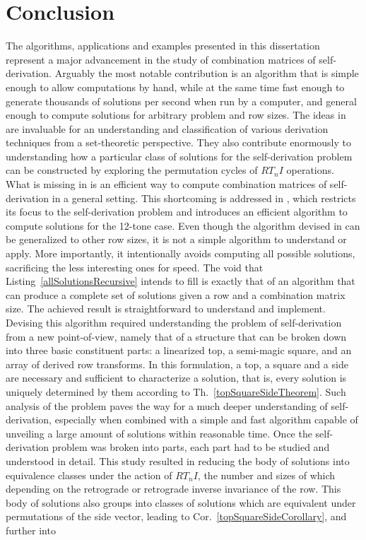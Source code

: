 
\section{Conclusion}

The algorithms, applications and examples presented in this dissertation represent a major advancement in the study of combination matrices of self-derivation. Arguably the most notable contribution is an algorithm that is simple enough to allow computations by hand, while at the same time fast enough to generate thousands of solutions per second when run by a computer, and general enough to compute solutions for arbitrary problem and row sizes. The ideas in \cite{Starr1984} are invaluable for an understanding and classification of various derivation techniques from a set-theoretic perspective. They also contribute enormously to understanding how a particular class of solutions for the self-derivation problem can be constructed by exploring the permutation cycles of $RT_nI$ operations. What is missing in \cite{Starr1984} is an efficient way to compute combination matrices of self-derivation in a general setting. This shortcoming is addressed in \cite{Kowalski1987b}, which restricts its focus to the self-derivation problem and introduces an efficient algorithm to compute solutions for the 12-tone case. Even though the algorithm devised in \cite{Kowalski1987b} can be generalized to other row sizes, it is not a simple algorithm to understand or apply. More importantly, it intentionally avoids computing all possible solutions, sacrificing the less interesting ones for speed. The void that Listing~\ref{allSolutionsRecursive} intends to fill is exactly that of an algorithm that can produce a complete set of solutions given a row and a combination matrix size. The achieved result is straightforward to understand and implement. Devising this algorithm required understanding the problem of self-derivation from a new point-of-view, namely that of a structure that can be broken down into three basic constituent parts: a linearized top, a semi-magic square, and an array of derived row transforms. In this formulation, a top, a square and a side are necessary and sufficient to characterize a solution, that is, every solution is uniquely determined by them according to Th.~\ref{topSquareSideTheorem}. Such analysis of the problem paves the way for a much deeper understanding of self-derivation, especially when combined with a simple and fast algorithm capable of unveiling a large amount of solutions within reasonable time. Once the self-derivation problem was broken into parts, each part had to be studied and understood in detail. This study resulted in reducing the body of solutions into equivalence classes under the action of $RT_nI$, the number and sizes of which depending on the retrograde or retrograde inverse invariance of the row. This body of solutions also groups into classes of solutions which are equivalent under permutations of the side vector, leading to Cor.~\ref{topSquareSideCorollary}, and further into 